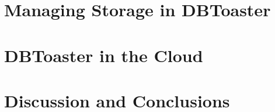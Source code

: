 \documentclass{sig-alternate}
\begin{document}
\section{Managing Storage in DBToaster}
\label{sec:storage}



\section{DBToaster in the Cloud}
\label{sec:distribution}


\section{Discussion and Conclusions}



\end{document}
